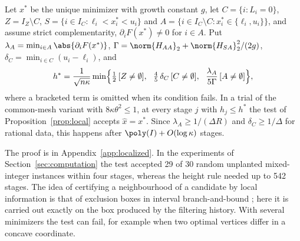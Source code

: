\begin{corollary}\label{cor:local}
Let $x^*$ be the unique minimizer with growth constant $g$, let $C=\{i:L_i=0\}$,
$Z=I_Z\setminus C$, $S=\{i\in I_C:\ell_i<x^*_i<u_i\}$ and
$A=\{i\in I_C\setminus C:x^*_i\in\{\ell_i,u_i\}\}$, and assume strict
complementarity, $\partial_iF(x^*)\ne0$ for $i\in A$. Put
$\lambda_A=\min_{i\in A}\abs{\partial_iF(x^*)}$,
$\Gamma=\norm{H_{AA}}_2+\norm{H_{SA}}_2^2/(2g)$, $\delta_C=\min_{i\in C}(u_i-\ell_i)$,
and
\[
h^*=\frac1{\sqrt{n\kappa}}\min\Bigl\{\tfrac12\,[Z\ne\emptyset],\ \
\tfrac45\,\delta_C\,[C\ne\emptyset],\ \ \frac{\lambda_A}{5\Gamma}\,[A\ne\emptyset]\Bigr\},
\]
where a bracketed term is omitted when its condition fails. In a trial of the
common-mesh variant with $8\kappa\theta^2\le1$, at every stage $j$ with
$h_j\le h^*$ the test of Proposition~\ref{prop:local} accepts $\hat x=x^*$. Since
$\lambda_A\ge1/(\Delta R)$ and $\delta_C\ge1/\Delta$ for rational data, this
happens after $\poly(I)+O(\log\kappa)$ stages.
\end{corollary}

The proof is in Appendix~\ref{app:localized}. In the experiments of
Section~\ref{sec:computation} the test accepted 29 of 30 random unplanted
mixed-integer instances within four stages, whereas the height rule needed up
to 542 stages. The idea of certifying a neighbourhood of a candidate by local
information is that of exclusion boxes in interval branch-and-bound
\cite{Neumaier2004}; here it is carried out exactly on the box produced by the
filtering history. With several minimizers the test can fail, for example when
two optimal vertices differ in a concave coordinate.
